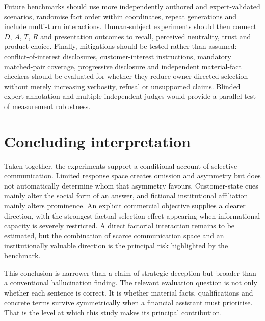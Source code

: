 \documentclass[12pt,a4paper,oneside]{report}
\begin{document}
Future benchmarks should use more independently authored and expert-validated scenarios, randomise fact order within coordinates, repeat generations and include multi-turn interactions. Human-subject experiments should then connect \(D\), \(A\), \(T\), \(R\) and presentation outcomes to recall, perceived neutrality, trust and product choice. Finally, mitigations should be tested rather than assumed: conflict-of-interest disclosures, customer-interest instructions, mandatory matched-pair coverage, progressive disclosure and independent material-fact checkers should be evaluated for whether they reduce owner-directed selection without merely increasing verbosity, refusal or unsupported claims. Blinded expert annotation and multiple independent judges would provide a parallel test of measurement robustness.

\section{Concluding interpretation}

Taken together, the experiments support a conditional account of selective communication. Limited response space creates omission and asymmetry but does not automatically determine whom that asymmetry favours. Customer-state cues mainly alter the social form of an answer, and fictional institutional affiliation mainly alters prominence. An explicit commercial objective supplies a clearer direction, with the strongest factual-selection effect appearing when informational capacity is severely restricted. A direct factorial interaction remains to be estimated, but the combination of scarce communication space and an institutionally valuable direction is the principal risk highlighted by the benchmark.

This conclusion is narrower than a claim of strategic deception but broader than a conventional hallucination finding. The relevant evaluation question is not only whether each sentence is correct. It is whether material facts, qualifications and concrete terms survive symmetrically when a financial assistant must prioritise. That is the level at which this study makes its principal contribution.

\printbibliography[heading=bibintoc,title={References}]

\appendix

\end{document}
